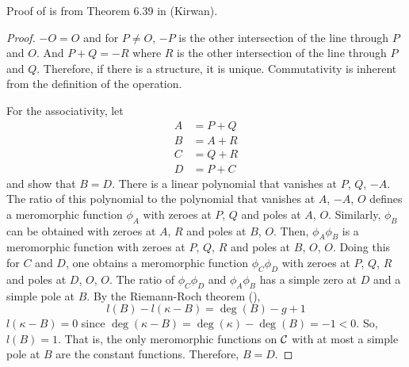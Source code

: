 Proof of  is from Theorem 6.39 in \cite{ref:kirwan} (Kirwan).

\begin{proof}
    $-O=O$ and for $P\neq O$, $-P$ is the other intersection of the line through $P$ and $O$. And $P+Q=-R$ where $R$ is the other intersection of the line through $P$ and $Q$. Therefore, if there is a structure, it is unique. Commutativity is inherent from the definition of the operation.
    
    For the associativity, let
    \begin{align*}
        A &= P+Q\\
        B &= A+R\\
        C &= Q+R\\
        D &= P+C
    \end{align*}
    and show that $B=D$. There is a linear polynomial that vanishes at $P$, $Q$, $-A$. The ratio of this polynomial to the polynomial that vanishes at $A$, $-A$, $O$ defines a meromorphic function $\phi_A$ with zeroes at $P$, $Q$ and poles at $A$, $O$. Similarly, $\phi_B$ can be obtained with zeroes at $A$, $R$ and poles at $B$, $O$. Then, $\phi_A\phi_B$ is a meromorphic function with zeroes at $P$, $Q$, $R$ and poles at $B$, $O$, $O$. Doing this for $C$ and $D$, one obtains a meromorphic function $\phi_C\phi_D$ with zeroes at $P$, $Q$, $R$ and poles at $D$, $O$, $O$. The ratio of $\phi_C\phi_D$ and $\phi_A\phi_B$ has a simple zero at $D$ and a simple pole at $B$. By the Riemann-Roch theorem  (),
    $$l(B)-l(\kappa-B)=\deg(B)-g+1$$
    $l(\kappa-B)=0$ since $\deg(\kappa-B)=\deg(\kappa)-\deg(B)=-1<0$. So, $l(B)=1$. That is, the only meromorphic functions on $\mathcal C$ with at most a simple pole at $B$ are the constant functions. Therefore, $B=D$.
\end{proof}

